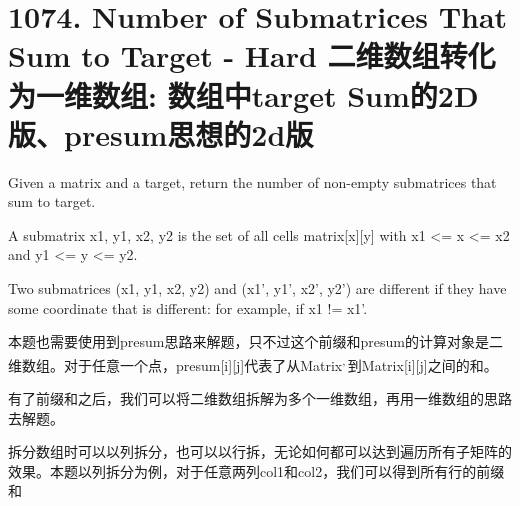 \documentclass[9pt, b5paaper]{book}
\begin{document}
\section{1074. Number of Submatrices That Sum to Target - Hard 二维数组转化为一维数组:  数组中target Sum的2D版、presum思想的2d版}
\label{sec-9-2}
Given a matrix and a target, return the number of non-empty submatrices that sum to target.

A submatrix x1, y1, x2, y2 is the set of all cells matrix[x][y] with x1 <= x <= x2 and y1 <= y <= y2.

Two submatrices (x1, y1, x2, y2) and (x1', y1', x2', y2') are different if they have some coordinate that is different: for example, if x1 != x1'.

本题也需要使用到presum思路来解题，只不过这个前缀和presum的计算对象是二维数组。对于任意一个点，presum[i][j]代表了从Matrix\footnotemark[1]{}\textsuperscript{,}\,\footnotemark[1]{}到Matrix[i][j]之间的和。

有了前缀和之后，我们可以将二维数组拆解为多个一维数组，再用一维数组的思路去解题。

拆分数组时可以以列拆分，也可以以行拆，无论如何都可以达到遍历所有子矩阵的效果。本题以列拆分为例，对于任意两列col1和col2，我们可以得到所有行的前缀和
\end{document}
